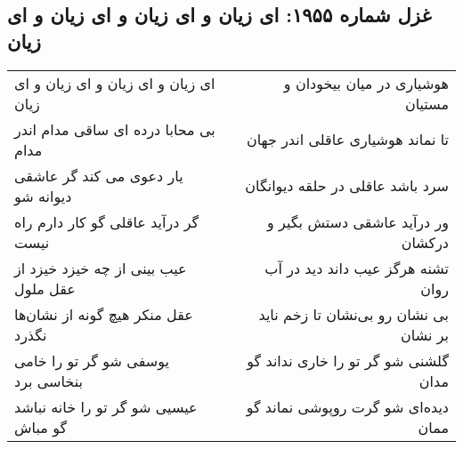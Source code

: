 \begin{center}
\section*{غزل شماره ۱۹۵۵: ای زیان و ای زیان و ای زیان و ای زیان}
\label{sec:1955}
\begin{longtable}{l p{0.5cm} r}
ای زیان و ای زیان و ای زیان و ای زیان
&&
هوشیاری در میان بیخودان و مستیان
\\
بی محابا درده ای ساقی مدام اندر مدام
&&
تا نماند هوشیاری عاقلی اندر جهان
\\
یار دعوی می کند گر عاشقی دیوانه شو
&&
سرد باشد عاقلی در حلقه دیوانگان
\\
گر درآید عاقلی گو کار دارم راه نیست
&&
ور درآید عاشقی دستش بگیر و درکشان
\\
عیب بینی از چه خیزد خیزد از عقل ملول
&&
تشنه هرگز عیب داند دید در آب روان
\\
عقل منکر هیچ گونه از نشان‌ها نگذرد
&&
بی نشان رو بی‌نشان تا زخم ناید بر نشان
\\
یوسفی شو گر تو را خامی بنخاسی برد
&&
گلشنی شو گر تو را خاری نداند گو مدان
\\
عیسیی شو گر تو را خانه نباشد گو مباش
&&
دیده‌ای شو گرت روپوشی نماند گو ممان
\\
\end{longtable}
\end{center}
